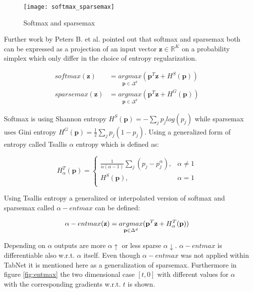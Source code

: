 \documentclass[../main.tex]{subfiles}
\begin{document}
\begin{figure}[H]
    \centering
    \texttt{[image: softmax\_sparsemax]}    
    \caption{Softmax and sparsemax}
    \label{fig:softmax_sparsemax}
\end{figure}

Further work by Peters B. et al. \cite{peters_sparse_2019} pointed out that softmax and sparsemax both can be expressed as a projection of an input vector $\mathbf{z} \in \mathbb{R}^K$ on a probability simplex which only differ in the choice of entropy regularization.

\begin{equation}
    \begin{aligned}
        softmax(\mathbf{z}) &= \underset{\mathbf{p} \in \Delta^d}{argmax} (\mathbf{p}^T\mathbf{z}+H^S(\mathbf{p})) \\
        sparsemax(\mathbf{z}) &= \underset{\mathbf{p} \in \Delta^d}{argmax} (\mathbf{p}^T\mathbf{z}+H^G(\mathbf{p}))
    \end{aligned}
\end{equation}

Softmax is using Shannon entropy $H^S(\mathbf{p})=-\sum_{j}p_j log(p_j)$ while sparsemax uses Gini entropy $H^G(\mathbf{p})=\frac{1}{2}\sum_j p_j (1-p_j)$. Using a generalized form of entropy called Tsallis $\alpha$ entropy which is defined as:

\begin{equation}
    H^T_\alpha(\mathbf{p}) =
    \begin{cases}
        \frac{1}{\alpha (\alpha - 1)} \sum_j (p_j-p_j^{\alpha}) ,& \alpha \ne 1 \\
        H^S(\mathbf{p}),& \alpha=1 \\
    \end{cases}
\end{equation}

Using Tsallis entropy a generalized or interpolated version of softmax and sparsemax called $\alpha-entmax$ can be defined:

\begin{equation}
    \alpha-entmax(\mathbf{z}) = \underset{\mathbf{p} \in \Delta^d}{argmax} (\mathbf{p}^T\mathbf{z}+H^T_{\alpha}(\mathbf{p})) \\            
\end{equation}

Depending on $\alpha$ outputs are more $\alpha \uparrow$ or less sparse $\alpha \downarrow$. $\alpha-entmax$ is differentiable also w.r.t. $\alpha$ itself. Even though $\alpha-entmax$ was not applied within TabNet it is mentioned here as a generalization of sparsemax. Furthermore in figure \ref{fig:entmax} the two dimensional case $[t,0]$ with different values for $\alpha$ with the corresponding gradients w.r.t. $t$ is shown. 
\end{document}
